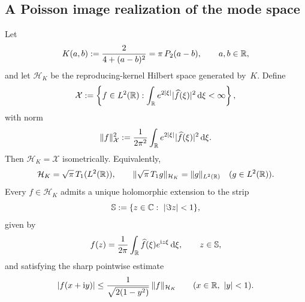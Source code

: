 \subsection{A Poisson image realization of the mode space}

\begin{proposition}%
\label{prop:gram-space-poisson-image}
Let
\[
K(a,b):=\frac{2}{4+(a-b)^2}=\pi\,P_2(a-b),
\qquad a,b\in\mathbb{R},
\]
and let $\mathcal H_K$ be the reproducing-kernel Hilbert space generated
by~$K$.  Define
\[
\mathcal X
:=
\left\{
f\in L^2(\mathbb{R}):
\int_{\mathbb{R}}e^{2|\xi|}\lvert \widehat f(\xi)\rvert^2\,\mathrm{d}\xi<\infty
\right\},
\]
with norm
\[
\|f\|_{\mathcal X}^2
:=\frac{1}{2\pi^2}\int_{\mathbb{R}}e^{2|\xi|}\lvert \widehat f(\xi)\rvert^2\,\mathrm{d}\xi.
\]
Then $\mathcal H_K=\mathcal X$ isometrically.  Equivalently,
\[
\mathcal H_K=\sqrt{\pi}\,T_1(L^2(\mathbb{R})),
\qquad
\|\sqrt{\pi}\,T_1 g\|_{\mathcal H_K}=\|g\|_{L^2(\mathbb{R})}
\quad(g\in L^2(\mathbb{R})).
\]
Every $f\in\mathcal H_K$ admits a unique holomorphic extension to the
strip
\[
\mathbb S:=\{z\in\mathbb{C}:\ |\Im z|<1\},
\]
given by
\[
f(z)=\frac{1}{2\pi}\int_{\mathbb{R}}\widehat f(\xi)e^{\mathrm{i} z\xi}\,\mathrm{d}\xi,
\qquad z\in\mathbb S,
\]
and satisfying the sharp pointwise estimate
\[
|f(x+\mathrm{i} y)|\le \frac{1}{\sqrt{2(1-y^2)}}\,\|f\|_{\mathcal H_K}
\qquad(x\in\mathbb{R},\ |y|<1).
\]
\end{proposition}

